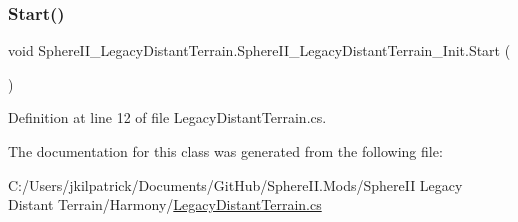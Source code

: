 \subsubsection{\texorpdfstring{Start()}{Start()}}
{\footnotesize\ttfamily void Sphere\+I\+I\+\_\+\+Legacy\+Distant\+Terrain.\+Sphere\+I\+I\+\_\+\+Legacy\+Distant\+Terrain\+\_\+\+Init.\+Start (\begin{DoxyParamCaption}{ }\end{DoxyParamCaption})}



Definition at line 12 of file Legacy\+Distant\+Terrain.\+cs.



The documentation for this class was generated from the following file\+:\begin{DoxyCompactItemize}
\item 
C\+:/\+Users/jkilpatrick/\+Documents/\+Git\+Hub/\+Sphere\+I\+I.\+Mods/\+Sphere\+I\+I Legacy Distant Terrain/\+Harmony/\mbox{\hyperlink{_legacy_distant_terrain_8cs}{Legacy\+Distant\+Terrain.\+cs}}\end{DoxyCompactItemize}
